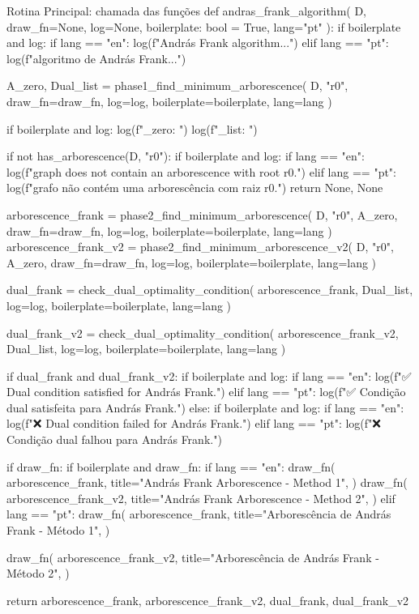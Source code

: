 \begin{pybox}{Rotina Principal: chamada das funções}
	def andras_frank_algorithm(
	D, draw_fn=None, log=None, boilerplate: bool = True, lang="pt"
	):
	if boilerplate and log:
	if lang == "en":
	log(f"\nExecuting András Frank algorithm...")
	elif lang == "pt":
	log(f"\nExecutando algoritmo de András Frank...")

	A_zero, Dual_list = phase1_find_minimum_arborescence(
	D, "r0", draw_fn=draw_fn, log=log, boilerplate=boilerplate, lang=lang
	)

	if boilerplate and log:
	log(f"\nA_zero: ")
	log(f"\nDual_list: ")

	if not has_arborescence(D, "r0"):
	if boilerplate and log:
	if lang == "en":
	log(f"\nThe graph does not contain an arborescence with root r0.")
	elif lang == "pt":
	log(f"\nO grafo não contém uma arborescência com raiz r0.")
	return None, None

	arborescence_frank = phase2_find_minimum_arborescence(
	D, "r0", A_zero, draw_fn=draw_fn, log=log, boilerplate=boilerplate, lang=lang
	)
	arborescence_frank_v2 = phase2_find_minimum_arborescence_v2(
	D, "r0", A_zero, draw_fn=draw_fn, log=log, boilerplate=boilerplate, lang=lang
	)

	dual_frank = check_dual_optimality_condition(
	arborescence_frank, Dual_list, log=log, boilerplate=boilerplate, lang=lang
	)

	dual_frank_v2 = check_dual_optimality_condition(
	arborescence_frank_v2, Dual_list, log=log, boilerplate=boilerplate, lang=lang
	)

	if dual_frank and dual_frank_v2:
	if boilerplate and log:
	if lang == "en":
	log(f"\n✅ Dual condition satisfied for András Frank.")
	elif lang == "pt":
	log(f"\n✅ Condição dual satisfeita para András Frank.")
	else:
	if boilerplate and log:
	if lang == "en":
	log(f"\n❌ Dual condition failed for András Frank.")
	elif lang == "pt":
	log(f"\n❌ Condição dual falhou para András Frank.")

	if draw_fn:
	if boilerplate and draw_fn:
	if lang == "en":
	draw_fn(
	arborescence_frank,
	title="András Frank Arborescence - Method 1",
	)
	draw_fn(
	arborescence_frank_v2,
	title="András Frank Arborescence - Method 2",
	)
	elif lang == "pt":
	draw_fn(
	arborescence_frank,
	title="Arborescência de András Frank - Método 1",
	)

	draw_fn(
	arborescence_frank_v2,
	title="Arborescência de András Frank - Método 2",
	)

	return arborescence_frank, arborescence_frank_v2, dual_frank, dual_frank_v2
\end{pybox}

